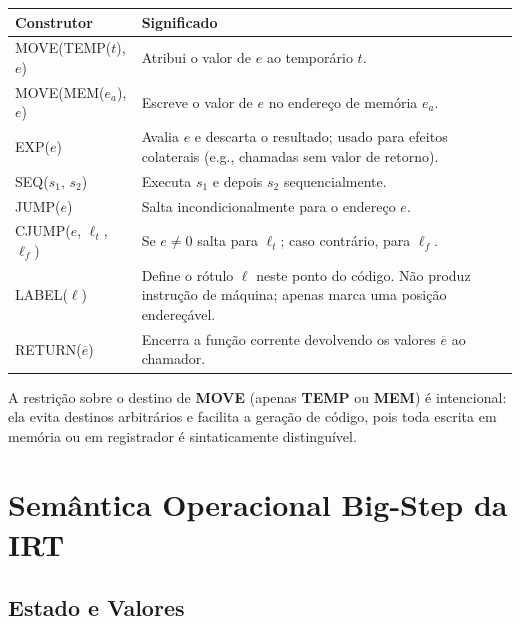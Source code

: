 \begin{center}
  \renewcommand{\arraystretch}{1.3}
  \begin{tabular}{>{\ttfamily}l p{9.5cm}}
    \toprule
    \normalfont Construtor & Significado \\
    \midrule
    MOVE(TEMP($t$), $e$) & Atribui o valor de $e$ ao temporário $t$. \\
    MOVE(MEM($e_a$), $e$) & Escreve o valor de $e$ no endereço de
    memória $e_a$. \\
    EXP($e$)             & Avalia $e$ e descarta o resultado; usado para efeitos
    colaterais (e.g., chamadas sem valor de retorno). \\
    SEQ($s_1$, $s_2$)    & Executa $s_1$ e depois $s_2$ sequencialmente. \\
    JUMP($e$)            & Salta incondicionalmente para o endereço $e$. \\
    CJUMP($e$, $\ell_t$, $\ell_f$) & Se $e \neq 0$ salta para $\ell_t$;
    caso contrário, para $\ell_f$. \\
    LABEL($\ell$)        & Define o rótulo $\ell$ neste ponto do código.
    Não produz instrução de máquina; apenas marca uma
    posição endereçável. \\
    RETURN($\overline{e}$) & Encerra a função corrente devolvendo os valores
    $\overline{e}$ ao chamador. \\
    \bottomrule
  \end{tabular}
\end{center}

\begin{remark}
  A restrição sobre o destino de \textbf{MOVE} (apenas \textbf{TEMP} ou
  \textbf{MEM}) é intencional: ela evita destinos arbitrários e facilita a
  geração de código, pois toda escrita em memória ou em registrador é
  sintaticamente distinguível.
\end{remark}

\section{Semântica Operacional Big-Step da IRT}\label{sec:irt-semantics}

\subsection{Estado e Valores}\label{sec:irt-state}

